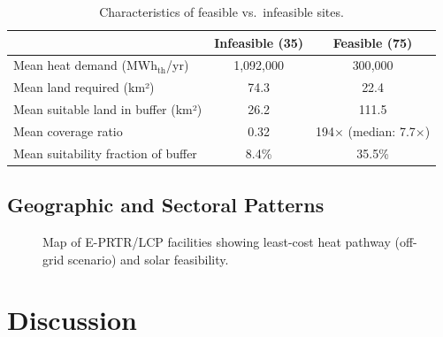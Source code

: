 \documentclass[12pt, a4paper]{article}
\begin{document}

\begin{table}[H]
  \centering
  \caption{Characteristics of feasible vs.\ infeasible sites.}
  \label{tab:feasibility}
  \begin{tabular}{lcc}
    \toprule
    & \textbf{Infeasible (35)} & \textbf{Feasible (75)} \\
    \midrule
    Mean heat demand (MWh$_\text{th}$/yr) & 1{,}092{,}000 & 300{,}000 \\
    Mean land required (km²)              & 74.3          & 22.4      \\
    Mean suitable land in buffer (km²)    & 26.2          & 111.5     \\
    Mean coverage ratio                   & 0.32          & 194$\times$ (median: 7.7$\times$) \\
    Mean suitability fraction of buffer   & 8.4\%         & 35.5\%    \\
    \bottomrule
  \end{tabular}
\end{table}


\subsection{Geographic and Sectoral Patterns}

\begin{figure}[H]
  \centering
  \caption{Map of E-PRTR/LCP facilities showing least-cost heat pathway
           (off-grid scenario) and solar feasibility.}
  \label{fig:map}
\end{figure}

\section{Discussion}
\label{sec:discussion}
\end{document}
